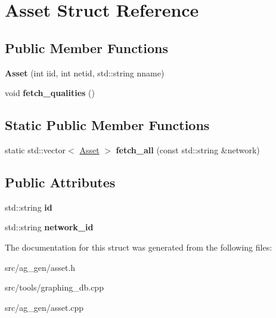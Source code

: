 \hypertarget{class_asset}{}\section{Asset Struct Reference}
\label{class_asset}
\subsection*{Public Member Functions}
\begin{DoxyCompactItemize}
\item 
\mbox{\label{class_asset_a988f61edbd7acb419206c4fa815ca5fa}} 
{\bfseries Asset} (int iid, int netid, std\+::string nname)
\item 
\mbox{\label{class_asset_a356396b8ac2d08f11cc4a22e32bab8a1}} 
void {\bfseries fetch\+\_\+qualities} ()
\end{DoxyCompactItemize}
\subsection*{Static Public Member Functions}
\begin{DoxyCompactItemize}
\item 
\mbox{\label{class_asset_ac5dcdf40f494198bd14fa853082f0c3d}} 
static std\+::vector$<$ \mbox{\hyperlink{class_asset}{Asset}} $>$ {\bfseries fetch\+\_\+all} (const std\+::string \&network)
\end{DoxyCompactItemize}
\subsection*{Public Attributes}
\begin{DoxyCompactItemize}
\item 
\mbox{\label{class_asset_ac37173d6b01d7b8caa7bd786b8de2269}} 
std\+::string {\bfseries id}
\item 
\mbox{\label{class_asset_a4d760fd5b921c34c0c0398441e73ea90}} 
std\+::string {\bfseries network\+\_\+id}
\end{DoxyCompactItemize}


The documentation for this struct was generated from the following files\+:\begin{DoxyCompactItemize}
\item 
src/ag\+\_\+gen/asset.\+h\item 
src/tools/graphing\+\_\+db.\+cpp\item 
src/ag\+\_\+gen/asset.\+cpp\end{DoxyCompactItemize}
